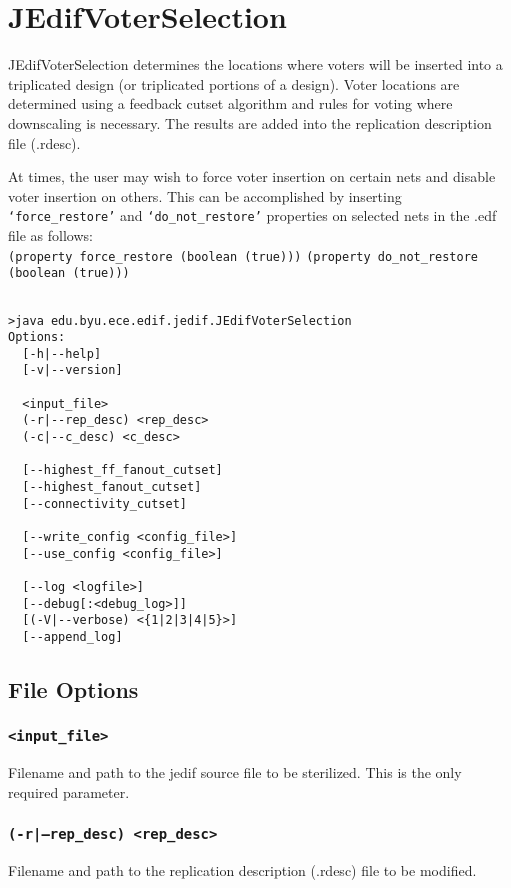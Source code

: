 \section{JEdifVoterSelection}
JEdifVoterSelection determines the locations where voters will be
inserted into a triplicated design (or triplicated portions of a
design). Voter locations are determined using a feedback cutset
algorithm and rules for voting where downscaling is necessary. The
results are added into the replication description file (.rdesc).

At times, the user may wish to force voter insertion on certain nets and
disable voter insertion on others. This can be accomplished by inserting
\texttt{`force\_restore'} and \texttt{`do\_not\_restore'} properties on
selected nets in the .edf file as follows:\\
\texttt{(property force\_restore (boolean (true)))}
\texttt{(property do\_not\_restore (boolean (true)))}\\

\begin{verbatim}

>java edu.byu.ece.edif.jedif.JEdifVoterSelection
Options:
  [-h|--help]
  [-v|--version]
  
  <input_file>
  (-r|--rep_desc) <rep_desc>
  (-c|--c_desc) <c_desc>

  [--highest_ff_fanout_cutset]
  [--highest_fanout_cutset]
  [--connectivity_cutset]

  [--write_config <config_file>]
  [--use_config <config_file>]

  [--log <logfile>]
  [--debug[:<debug_log>]]
  [(-V|--verbose) <{1|2|3|4|5}>]
  [--append_log]
\end{verbatim}
\subsection{File Options}

\subsubsection{\texttt{<input\_file>}}
Filename and path to the jedif source file to be
sterilized. This is the only required parameter.

\subsubsection{\texttt{(-r|--rep\_desc) <rep\_desc>}}
Filename and path to the replication description (.rdesc) file to be modified.


